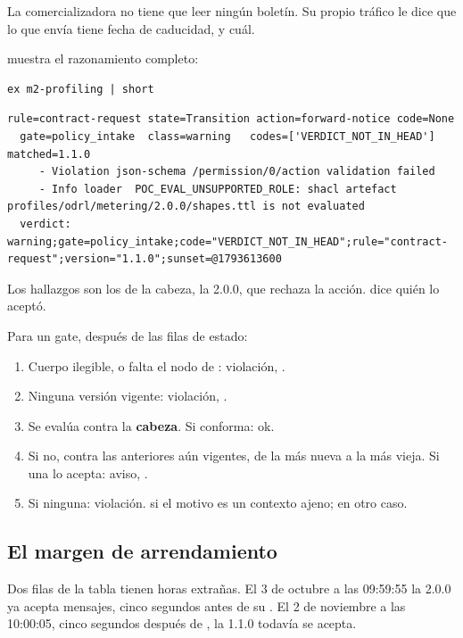 \medskip
La comercializadora no tiene que leer ningún boletín. Su propio tráfico le dice que lo que envía tiene fecha de
caducidad, y cuál.

 muestra el razonamiento completo:

\begin{lstlisting}[style=sh]
ex m2-profiling | short
\end{lstlisting}
\begin{lstlisting}[style=out]
rule=contract-request state=Transition action=forward-notice code=None
  gate=policy_intake  class=warning   codes=['VERDICT_NOT_IN_HEAD'] matched=1.1.0
     - Violation json-schema /permission/0/action validation failed
     - Info loader  POC_EVAL_UNSUPPORTED_ROLE: shacl artefact profiles/odrl/metering/2.0.0/shapes.ttl is not evaluated
  verdict: warning;gate=policy_intake;code="VERDICT_NOT_IN_HEAD";rule="contract-request";version="1.1.0";sunset=@1793613600
\end{lstlisting}

Los hallazgos son los de la cabeza, la 2.0.0, que rechaza la acción.  dice quién lo aceptó.

\begin{bajoElCapo}
Para un gate, después de las filas de estado:
\begin{enumerate}[leftmargin=*, itemsep=1pt]
  \item Cuerpo ilegible, o falta el nodo de : violación, .
  \item Ninguna versión vigente: violación, .
  \item Se evalúa contra la \textbf{cabeza}. Si conforma: ok.
  \item Si no, contra las anteriores aún vigentes, de la más nueva a la más vieja. Si una lo acepta: aviso,
        .
  \item Si ninguna: violación.  si el motivo es un contexto ajeno;
         en otro caso.
\end{enumerate}
\end{bajoElCapo}

\subsection{El margen de arrendamiento}

Dos filas de la tabla tienen horas extrañas. El 3 de octubre a las 09:59:55 la 2.0.0 ya acepta mensajes, cinco
segundos antes de su . El 2 de noviembre a las 10:00:05, cinco segundos después de
, la 1.1.0 todavía se acepta.

